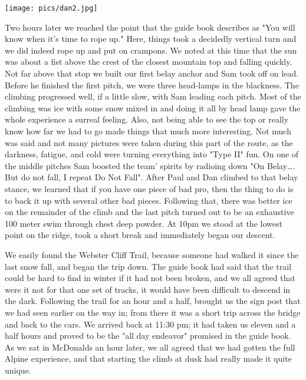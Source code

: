 \documentclass[10pt,a4paper]{article}
\newenvironment{Figure}
  {\par\medskip\noindent\minipage{\linewidth}}
  {\endminipage\par\medskip}
\begin{document}
\begin{multicols}{2}
\begin{Figure}
 \centering
 \texttt{[image: pics/dan2.jpg]}
\end{Figure}


Two hours later we reached the point that the guide book describes as "You will know when it's time to rope up."  Here, things took a decidedly vertical turn and we did indeed rope up and put on crampons.  We noted at this time that the sun was about a fist above the crest of the closest mountain top and falling quickly.  Not far above that stop we built our first belay anchor and Sam took off on lead.  Before he finished the first pitch, we were three head-lamps in the blackness. The climbing progressed well, if a little slow, with Sam leading each pitch.  Most of the climbing was ice with some snow mixed in and doing it all by head lamp gave the whole experience a surreal feeling.  Also, not being able to see the top or really know how far we had to go made things that much more interesting.  Not much was said and not many pictures were taken during this part of the route, as the darkness, fatigue, and cold were turning everything into "Type II" fun.  On one of the middle pitches Sam boosted the team' spirits by radioing down "On Belay…. But do not fall, I repeat Do Not Fall".  After Paul and Dan climbed to that belay stance, we learned that if you have one piece of bad pro, then the thing to do is to back it up with several other bad pieces.  Following that, there was better ice on the remainder of the climb and the last pitch turned out to be an exhaustive 100 meter swim through chest deep powder.  At 10pm we stood at the lowest point on the ridge, took a short break and immediately began our descent. 


We easily found the Webster Cliff Trail, because someone had walked it since the last snow fall, and began the trip down.  The guide book had said that the trail could be hard to find in winter if it had not been broken, and we all agreed that were it not for that one set of tracks, it would have been difficult to descend in the dark. Following the trail for an hour and a half, brought us the sign post that we had seen earlier on the way in; from there it was a short trip across the bridge and back to the cars.  We arrived back at 11:30 pm; it had taken us eleven and a half hours and proved to be the "all day endeavor" promised in the guide book.  As we sat in McDonalds an hour later, we all agreed that we had gotten the full Alpine experience, and that starting the climb at dusk had really made it quite unique.


\end{multicols}
\end{document}
